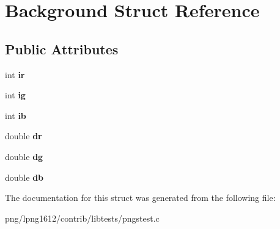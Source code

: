 \hypertarget{struct_background}{\section{Background Struct Reference}
\label{struct_background}
}
\subsection*{Public Attributes}
\begin{DoxyCompactItemize}
\item 
\hypertarget{struct_background_ad0696f4d9992091f7e4000ca3c164417}{int {\bfseries ir}}\label{struct_background_ad0696f4d9992091f7e4000ca3c164417}

\item 
\hypertarget{struct_background_a3732cab29344021f3ecee5573a84793d}{int {\bfseries ig}}\label{struct_background_a3732cab29344021f3ecee5573a84793d}

\item 
\hypertarget{struct_background_af6fd0ba481f14c65cff6a29eb6c825e8}{int {\bfseries ib}}\label{struct_background_af6fd0ba481f14c65cff6a29eb6c825e8}

\item 
\hypertarget{struct_background_a926ea191c4051b2af9754cb72050943f}{double {\bfseries dr}}\label{struct_background_a926ea191c4051b2af9754cb72050943f}

\item 
\hypertarget{struct_background_a997b3292e09a2ba7cac44a4cd440e8f7}{double {\bfseries dg}}\label{struct_background_a997b3292e09a2ba7cac44a4cd440e8f7}

\item 
\hypertarget{struct_background_a176da6955ede00633ca11b42df7601f2}{double {\bfseries db}}\label{struct_background_a176da6955ede00633ca11b42df7601f2}

\end{DoxyCompactItemize}


The documentation for this struct was generated from the following file\+:\begin{DoxyCompactItemize}
\item 
png/lpng1612/contrib/libtests/pngstest.\+c\end{DoxyCompactItemize}
